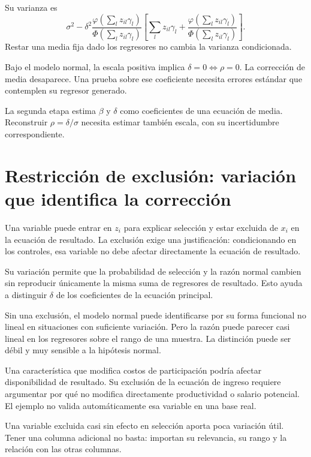 \documentclass[11pt,a4paper]{article}
\begin{document}
Su varianza es
\[
\sigma^2-\delta^2
\frac{\varphi(\sum_lz_{il}\gamma_l)}
{\Phi(\sum_lz_{il}\gamma_l)}
\left[
\sum_lz_{il}\gamma_l+
\frac{\varphi(\sum_lz_{il}\gamma_l)}
{\Phi(\sum_lz_{il}\gamma_l)}
\right].
\]
Restar una media fija
dado los regresores no
cambia la varianza condicionada.

\begin{ejemplo}[Qué se prueba con \(\delta=0\)]
Bajo el modelo normal,
la escala positiva implica
\(\delta=0\Longleftrightarrow\rho=0\).
La corrección de media desaparece.
Una prueba sobre ese coeficiente
necesita errores estándar
que contemplen su regresor generado.
\end{ejemplo}
La segunda etapa estima
\(\beta\) y \(\delta\)
como coeficientes de una
ecuación de media.
Reconstruir \(\rho=\delta/\sigma\)
necesita estimar también escala,
con su incertidumbre correspondiente.

\clearpage
\section{Restricción de exclusión: variación que identifica la corrección}\label{unidad128}
Una variable puede entrar en \(z_i\)
para explicar selección y
estar excluida de \(x_i\)
en la ecuación de resultado.
La exclusión exige una justificación:
condicionando en los controles,
esa variable no debe afectar
directamente la ecuación de resultado.

Su variación permite que
la probabilidad de selección
y la razón normal cambien
sin reproducir únicamente
la misma suma de regresores
de resultado.
Esto ayuda a distinguir
\(\delta\) de los coeficientes
de la ecuación principal.

Sin una exclusión, el modelo
normal puede identificarse
por su forma funcional no lineal
en situaciones con suficiente variación.
Pero la razón puede parecer
casi lineal en los regresores
sobre el rango de una muestra.
La distinción puede ser débil
y muy sensible a la hipótesis normal.

\begin{ejemplo}
Una característica que modifica
costos de participación podría
afectar disponibilidad de resultado.
Su exclusión de la ecuación
de ingreso requiere argumentar
por qué no modifica directamente
productividad o salario potencial.
El ejemplo no valida automáticamente
esa variable en una base real.
\end{ejemplo}
Una variable excluida casi sin
efecto en selección aporta
poca variación útil.
Tener una columna adicional
no basta: importan su
relevancia, su rango y
la relación con las
otras columnas.
\end{document}

